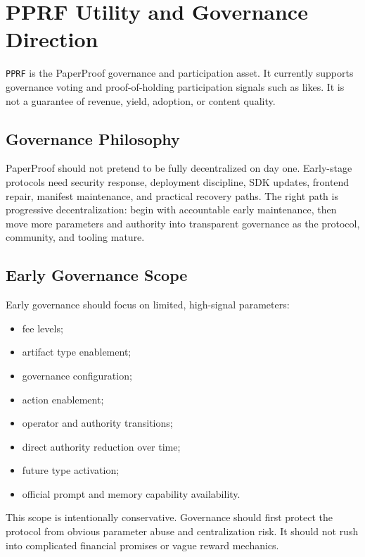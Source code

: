\documentclass[11pt]{article}
\newcommand{\code}[1]{\texttt{#1}}
\newcommand{\pprf}{\code{PPRF}}
\begin{document}
\section{PPRF Utility and Governance Direction}

\pprf{} is the PaperProof governance and participation asset. It currently
supports governance voting and proof-of-holding participation signals such as
likes. It is not a guarantee of revenue, yield, adoption, or content quality.

\subsection{Governance Philosophy}

PaperProof should not pretend to be fully decentralized on day one. Early-stage
protocols need security response, deployment discipline, SDK updates, frontend
repair, manifest maintenance, and practical recovery paths. The right path is
progressive decentralization: begin with accountable early maintenance, then
move more parameters and authority into transparent governance as the protocol,
community, and tooling mature.

\subsection{Early Governance Scope}

Early governance should focus on limited, high-signal parameters:

\begin{itemize}[leftmargin=*]
  \item fee levels;
  \item artifact type enablement;
  \item governance configuration;
  \item action enablement;
  \item operator and authority transitions;
  \item direct authority reduction over time;
  \item future type activation;
  \item official prompt and memory capability availability.
\end{itemize}

This scope is intentionally conservative. Governance should first protect the
protocol from obvious parameter abuse and centralization risk. It should not
rush into complicated financial promises or vague reward mechanics.
\end{document}
